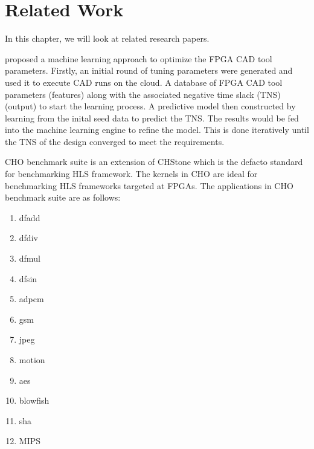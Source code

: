 \chapter{Related Work}
In  this  chapter,  we  will  look  at   related  research  papers. 

\cite{kapre2015driving} proposed a machine learning approach to optimize the FPGA CAD tool parameters. Firstly, an initial round of tuning parameters were generated and used it to execute CAD runs on the cloud. A database of FPGA CAD tool parameters (features) along with the associated negative time slack (TNS) (output) to start the learning process. A predictive model then constructed by learning from the inital seed data to predict the TNS. The results would be fed into the machine learning engine to refine the model. This is done iteratively until the TNS of the design converged to meet the requirements.

CHO benchmark suite \citep{ndu2015cho} is an extension of CHStone which is the defacto standard for benchmarking HLS framework. The kernels in CHO are ideal for benchmarking HLS frameworks targeted at FPGAs. The applications in CHO benchmark suite are as follows:

\begin{enumerate}
    \item dfadd
    \item dfdiv
    \item dfmul
    \item dfsin
    \item adpcm
    \item gsm
    \item jpeg
    \item motion
    \item aes
    \item blowfish
    \item sha
    \item MIPS
\end{enumerate}

